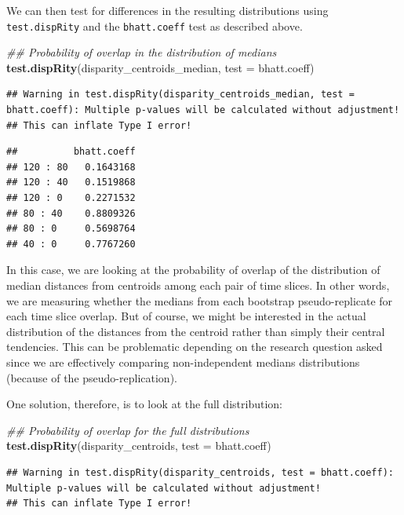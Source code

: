 \documentclass[]{book}
\newenvironment{Shaded}{\begin{snugshade}}{\end{snugshade}}
\newcommand{\CommentTok}[1]{\textcolor[rgb]{0.56,0.35,0.01}{\textit{#1}}}
\newcommand{\DataTypeTok}[1]{\textcolor[rgb]{0.13,0.29,0.53}{#1}}
\newcommand{\KeywordTok}[1]{\textcolor[rgb]{0.13,0.29,0.53}{\textbf{#1}}}
\newcommand{\NormalTok}[1]{#1}
\begin{document}
We can then test for differences in the resulting distributions using \texttt{test.dispRity} and the \texttt{bhatt.coeff} test as described above.

\begin{Shaded}
\begin{Highlighting}[]
\CommentTok{## Probability of overlap in the distribution of medians}
\KeywordTok{test.dispRity}\NormalTok{(disparity_centroids_median, }\DataTypeTok{test =}\NormalTok{ bhatt.coeff)}
\end{Highlighting}
\end{Shaded}

\begin{verbatim}
## Warning in test.dispRity(disparity_centroids_median, test = bhatt.coeff): Multiple p-values will be calculated without adjustment!
## This can inflate Type I error!
\end{verbatim}

\begin{verbatim}
##          bhatt.coeff
## 120 : 80   0.1643168
## 120 : 40   0.1519868
## 120 : 0    0.2271532
## 80 : 40    0.8809326
## 80 : 0     0.5698764
## 40 : 0     0.7767260
\end{verbatim}

In this case, we are looking at the probability of overlap of the distribution of median distances from centroids among each pair of time slices.
In other words, we are measuring whether the medians from each bootstrap pseudo-replicate for each time slice overlap.
But of course, we might be interested in the actual distribution of the distances from the centroid rather than simply their central tendencies.
This can be problematic depending on the research question asked since we are effectively comparing non-independent medians distributions (because of the pseudo-replication).

One solution, therefore, is to look at the full distribution:

\begin{Shaded}
\begin{Highlighting}[]
\CommentTok{## Probability of overlap for the full distributions}
\KeywordTok{test.dispRity}\NormalTok{(disparity_centroids, }\DataTypeTok{test =}\NormalTok{ bhatt.coeff)}
\end{Highlighting}
\end{Shaded}

\begin{verbatim}
## Warning in test.dispRity(disparity_centroids, test = bhatt.coeff): Multiple p-values will be calculated without adjustment!
## This can inflate Type I error!
\end{verbatim}
\end{document}

